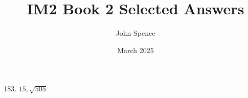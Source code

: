 \documentclass{article}
\title{IM2 Book 2 Selected Answers}
\author{John Spence}
\date{March 2025}
\begin{document}
\maketitle

\begin{enumerate}

\setcounter{enumi}{182}

\item $15, \sqrt{505}$

\end{enumerate}
\end{document}
